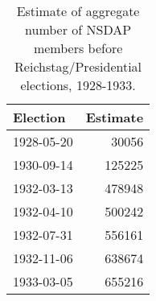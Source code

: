 \begin{table}[t!]
\centering
\caption{Estimate of aggregate number of NSDAP members before Reichstag/Presidential elections, 1928-1933.\label{tab:memberscount}} 
\begingroup\small
\begin{tabular}{lr}
  \toprule
Election & Estimate \\ 
  \midrule
1928-05-20 & 30056 \\ 
  1930-09-14 & 125225 \\ 
  1932-03-13 & 478948 \\ 
  1932-04-10 & 500242 \\ 
  1932-07-31 & 556161 \\ 
  1932-11-06 & 638674 \\ 
  1933-03-05 & 655216 \\ 
   \bottomrule
\end{tabular}
\endgroup
\end{table}
